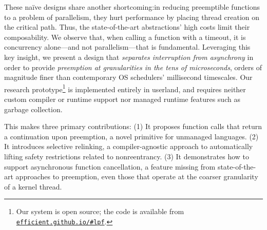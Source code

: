 These na\"ive designs share another shortcoming:\@ in reducing
preemptible functions to a problem of parallelism, they hurt performance by placing
thread creation on the critical path.  Thus, the state-of-the-art abstractions' high
costs limit their composability.  We observe that, when calling a function with
a timeout, it is concurrency alone---and not parallelism---that is fundamental.
Leveraging this key insight, we present a design that \textit{separates interruption
from asynchrony} in order to provide \textit{preemption at granularities in the tens
of microseconds}, orders of magnitude finer than contemporary OS schedulers'
millisecond timescales.  Our research prototype\footnote{Our system is open source;
the code is available from
\href{https://efficient.github.io/\#lpf}{\texttt{efficient.github.io/\#lpf}}.} is
implemented entirely in userland, and
requires neither custom compiler or runtime support nor managed runtime features such
as garbage collection.

This \paper makes three primary contributions:  (1) It proposes function calls that
return a continuation upon preemption, a novel primitive for unmanaged languages.
(2) It introduces selective relinking, a compiler-agnostic approach to automatically
lifting safety restrictions related to nonreentrancy.  (3) It demonstrates how to
support asynchronous function cancellation, a feature missing from state-of-the-art
approaches to preemption, even those that operate at the coarser granularity of a
kernel thread.
